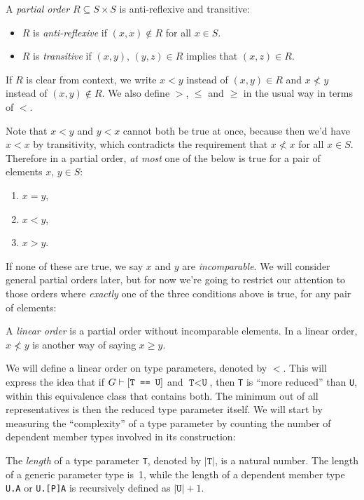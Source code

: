 \documentclass[../generics]{subfiles}
\begin{document}
\begin{definition}\label{def order}
A \emph{partial order} $R\subseteq S\times S$ is anti-reflexive and transitive:
\begin{itemize}
\item $R$ is \emph{anti-reflexive} if $(x,x)\notin R$ for all $x\in S$.
\item $R$ is \emph{transitive} if $(x,y)$, $(y,z)\in R$ implies that $(x,z)\in R$.
\end{itemize}
If $R$ is clear from context, we write $x<y$ instead of $(x,y)\in R$ and $x\not< y$ instead of $(x,y)\notin R$. We also define $>$, $\leq$ and $\geq$ in the usual way in terms of $<$.
\end{definition}
Note that $x<y$ and $y<x$ cannot both be true at once, because then we'd have $x<x$ by transitivity, which contradicts the requirement that $x\not< x$ for all $x\in S$. Therefore in a partial order, \emph{at most} one of the below is true for a pair of elements $x$, $y\in S$:
\begin{enumerate}
\item $x=y$,
\item $x<y$,
\item $x>y$.
\end{enumerate}
If none of these are true, we say $x$ and $y$ are \emph{incomparable}. We will consider general partial orders later, but for now we're going to restrict our attention to those orders where \emph{exactly} one of the three conditions above is true, for any pair of elements:
\begin{definition}
A \emph{linear order} is a partial order without incomparable elements. In a linear order, $x\not< y$ is another way of saying $x \geq y$.
\end{definition}

We will define a linear order on type parameters, denoted by $<$. This will express the idea that if $G\vdash[\texttt{T == U}]$ and $\texttt{T}<\texttt{U}$, then \texttt{T} is ``more reduced'' than \texttt{U}, within this equivalence class that contains both. The minimum out of all representatives is then the reduced type parameter itself. We will start by measuring the ``complexity'' of a type parameter by counting the number of dependent member types involved in its construction:
\begin{definition}
The \emph{length} of a type parameter \texttt{T}, denoted by $|\texttt{T}|$, is a natural number. The length of a generic parameter type is~1, while the length of a dependent member type \texttt{U.A} or \texttt{U.[P]A} is recursively defined as $|\texttt{U}|+1$.
\end{definition}
\end{document}
